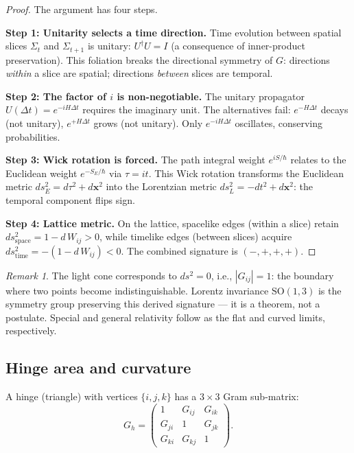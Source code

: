 \documentclass[12pt]{article}
\theoremstyle{remark}
\newtheorem{remark}[theorem]{Remark}
\theoremstyle{definition}
\begin{document}
\begin{proof}
The argument has four steps.

\medskip
\noindent\textbf{Step 1: Unitarity selects a time direction.}
Time evolution between spatial slices $\Sigma_t$ and $\Sigma_{t+1}$ is unitary: $U^\dagger U = I$ (a consequence of inner-product preservation). This foliation breaks the directional symmetry of $G$: directions \emph{within} a slice are spatial; directions \emph{between} slices are temporal.

\medskip
\noindent\textbf{Step 2: The factor of $i$ is non-negotiable.}
The unitary propagator $U(\Delta t) = e^{-iH\Delta t}$ requires the imaginary unit. The alternatives fail: $e^{-H\Delta t}$ decays (not unitary), $e^{+H\Delta t}$ grows (not unitary). Only $e^{-iH\Delta t}$ oscillates, conserving probabilities.

\medskip
\noindent\textbf{Step 3: Wick rotation is forced.}
The path integral weight $e^{iS/\hbar}$ relates to the Euclidean weight $e^{-S_E/\hbar}$ via $\tau = it$. This Wick rotation transforms the Euclidean metric $ds^2_E = d\tau^2 + d\mathbf{x}^2$ into the Lorentzian metric $ds^2_L = -dt^2 + d\mathbf{x}^2$: the temporal component flips sign.

\medskip
\noindent\textbf{Step 4: Lattice metric.}
On the lattice, spacelike edges (within a slice) retain $ds^2_\text{space} = 1 - d\,W_{ij} > 0$, while timelike edges (between slices) acquire $ds^2_\text{time} = -(1 - d\,W_{ij}) < 0$. The combined signature is $(-,+,+,+)$.
\end{proof}

\begin{remark}
The light cone corresponds to $ds^2 = 0$, i.e., $|G_{ij}| = 1$: the boundary where two points become indistinguishable. Lorentz invariance $\text{SO}(1,3)$ is the symmetry group preserving this derived signature --- it is a theorem, not a postulate. Special and general relativity follow as the flat and curved limits, respectively.
\end{remark}

\subsection{Hinge area and curvature}

A hinge (triangle) with vertices $\{i, j, k\}$ has a $3\times 3$ Gram sub-matrix:
\begin{equation}
G_h = \begin{pmatrix} 1 & G_{ij} & G_{ik} \\ G_{ji} & 1 & G_{jk} \\ G_{ki} & G_{kj} & 1 \end{pmatrix}.
\end{equation}
\end{document}
